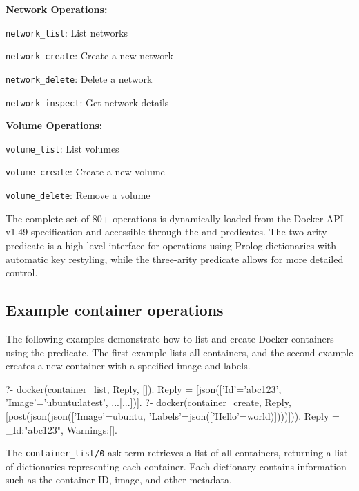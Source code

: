 \textbf{Network Operations:}

\begin{shortlist}
    \item \verb$network_list$: List networks
    \item \verb$network_create$: Create a new network
    \item \verb$network_delete$: Delete a network
    \item \verb$network_inspect$: Get network details
\end{shortlist}

\textbf{Volume Operations:}

\begin{shortlist}
    \item \verb$volume_list$: List volumes
    \item \verb$volume_create$: Create a new volume
    \item \verb$volume_delete$: Remove a volume
\end{shortlist}

The complete set of 80+ operations is dynamically loaded from the Docker
API v1.49 specification and accessible through the  and
 predicates. The two-arity predicate  is a
high-level interface for operations using Prolog dictionaries with
automatic key restyling, while the three-arity predicate 
allows for more detailed control.

\subsection{Example container operations}

The following examples demonstrate how to list and create Docker
containers using the  predicate. The first example lists all
containers, and the second example creates a new container with a
specified image and labels.

\begin{code}
?- docker(container_list, Reply, []).
Reply = [json(['Id'='abc123', 'Image'='ubuntu:latest', ...|...])].
?- docker(container_create, Reply, [post(json(json(['Image'=ubuntu,
   'Labels'=json(['Hello'=world)])))])).
Reply = _{Id:"abc123", Warnings:[]}.
\end{code}

The \verb$container_list/0$ ask term retrieves a list of all containers,
returning a list of dictionaries representing each container. Each
dictionary contains information such as the container ID, image, and
other metadata.

